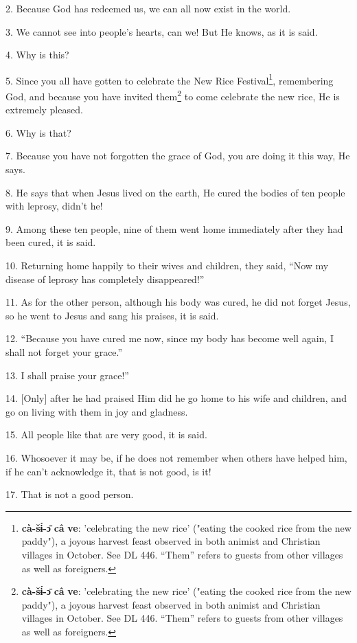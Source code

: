 2. Because God has redeemed us, we can all now exist in the world.

3. We cannot see into people's hearts, can we! But He knows, as it is said.

4. Why is this?

5. Since you all have gotten to celebrate the New Rice Festival\footnote{\textbf{cà-šɨ́-ɔ̄} \textbf{câ} \textbf{ve}: 'celebrating the new rice' ("eating the cooked rice from the new paddy"), a joyous harvest feast observed in both animist and Christian villages in October. See DL 446. ``Them'' refers to guests from other villages as well as foreigners.}, remembering
God, and because you have invited them\footnote{\textbf{cà-šɨ́-ɔ̄} \textbf{câ} \textbf{ve}: 'celebrating the new rice' ("eating the cooked rice from the new paddy"), a joyous harvest feast observed in both animist and Christian villages in October. See DL 446. ``Them'' refers to guests from other villages as well as foreigners.} to come celebrate the new rice, He is
extremely pleased.

6. Why is that?

7. Because you have not forgotten the grace of God, you are doing it this way,
He says.

8. He says that when Jesus lived on the earth, He cured the bodies of ten people
with leprosy, didn't he!

9. Among these ten people, nine of them went home immediately after they had been
cured, it is said.

10. Returning home happily to their wives and children, they said, ``Now my disease
of leprosy has completely disappeared!''

11. As for the other person, although his body was cured, he did not forget Jesus,
so he went to Jesus and sang his praises, it is said.

12. ``Because you have cured me now, since my body has become well again, I shall
not forget your grace.''

13. I shall praise your grace!''

14. [Only] after he had praised Him did he go home to his wife and children, and
go on living with them in joy and gladness.

15. All people like that are very good, it is said.

16. Whosoever it may be, if he does not remember when others have helped him, if
he can't acknowledge it, that is not good, is it!

17. That is not a good person.

